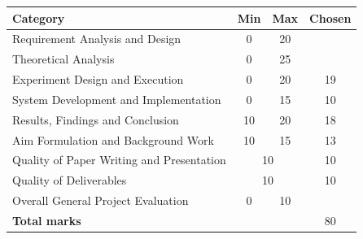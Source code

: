 \documentclass{sig-alternate-05-2015}
\begin{document}
	\renewcommand{\arraystretch}{1.25}
	\begin{tabular}{|l|c|c|c|}
		\hline
		\textbf{Category} & \textbf{Min} & \textbf{Max} & \textbf{Chosen} \\ \hline \hline
		Requirement Analysis and Design & 0 & 20 &
		 \\ \hline
		Theoretical Analysis & 0 & 25 &
		 \\ \hline
		Experiment Design and Execution & 0 & 20 &
		19 \\ \hline
		System Development and Implementation & 0 & 15 &
		10 \\ \hline
		Results, Findings and Conclusion & 10 & 20 &
		18 \\ \hline
		Aim Formulation and Background Work & 10 & 15 &
		13 \\ \hline
		Quality of Paper Writing and Presentation & \multicolumn{2}{c|}{10} &
		10 \\ \hline
		Quality of Deliverables & \multicolumn{2}{c|}{10} &
		10 \\ \hline
		Overall General Project Evaluation & 0 & 10 &
		\\ \hline
		\hline
		\multicolumn{3}{|l|}{\textbf{Total marks}} & 80 \\ \hline
	\end{tabular}
	
	\endgroup
	\thispagestyle{empty}
	\newpage
	\setcounter{page}{1}
	
	
	
	
	
	
	
	
	
\end{document}
